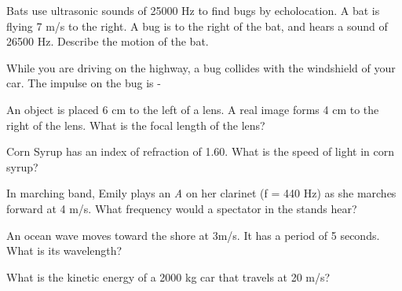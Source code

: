 \documentclass[10pt]{examdesign}
\begin{document}
\begin{multiplechoice} [title={Multiple Choice (3 Points Each)},
	rearrange=No]
\begin{block}
\begin{question}
\end{question}
\end{block}

\begin{question}
Bats use ultrasonic sounds of 25000 Hz to find bugs by echolocation.  A bat is flying 7 m/s to the right.  A bug is to the right of the bat, and hears a sound of 26500 Hz.  Describe the motion of the bat.
\end{question}

\begin{question}
	While you are driving on the highway, a bug collides with the windshield of your car.  The impulse on the bug is - 
\end{question}


\begin{question}
	An object is placed 6 cm to the left of a lens.  A real image forms 4 cm to the right of the lens.  What is the focal length of the lens?
	
\end{question}

\begin{question}
 Corn Syrup has an index of refraction of 1.60.  What is the speed of light in corn syrup?

\end{question}

\begin{question}
	In marching band, Emily plays an \textit{A} on her clarinet (f = 440 Hz) as she marches forward at 4 m/s.  What frequency would a spectator in the stands hear? 

\end{question}

\begin{question}
	An ocean wave moves toward the shore at 3m/s.  It has a period of 5 seconds.  What is its wavelength?

\end{question}



\begin{question}
	What is the kinetic energy of a 2000 kg car that travels at 20 m/s?

\end{question}


\end{multiplechoice}
\end{document}
